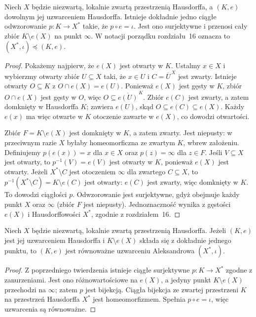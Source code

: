\begin{twierdzenie}
\label{thm:topog-uzwarcenia-aleksandrow-minimalne}
Niech $X$ będzie niezwartą,
lokalnie zwartą przestrzenią Hausdorffa,
a $(K,e)$ dowolnym jej uzwarceniem
Hausdorffa. Istnieje dokładnie jedno
ciągłe odwzorowanie
$p\colon K\to X^\ast$ takie, że
$p\circ e=\iota$.
Jest ono surjektywne
i przenosi cały zbiór
$K\setminus e(X)$ na punkt $\infty$.
W notacji porządku rozdziału~16
oznacza to $(X^\ast,\iota)\preccurlyeq(K,e)$.
\end{twierdzenie}
\begin{proof}
Pokażemy najpierw, że $e(X)$
jest otwarty w $K$.
Ustalmy $x\in X$ i wybierzmy
otwarty zbiór $U\subseteq X$
taki, że $x\in U$ i
$C=\overline U^{\,X}$ jest zwarty.
Istnieje otwarty $O\subseteq K$
z $O\cap e(X)=e(U)$.
Ponieważ $e(X)$ jest gęsty w $K$,
zbiór $O\cap e(X)$ jest gęsty w $O$,
więc
$O\subseteq\overline{e(U)}^{\,K}$.
Zbiór $e(C)$ jest zwarty, a zatem
domknięty w Hausdorffa $K$;
zawiera $e(U)$, skąd
$O\subseteq e(C)\subseteq e(X)$.
Każdy $e(x)$ ma więc
otwarte w $K$ otoczenie zawarte
w $e(X)$, co dowodzi otwartości.

Zbiór $F=K\setminus e(X)$ jest
domknięty w $K$, a zatem zwarty.
Jest niepusty: w przeciwnym razie
$X$ byłaby homeomorficzna ze zwartym
$K$, wbrew założeniu.
Definiujemy
$p(e(x))=x$ dla $x\in X$
oraz $p(z)=\infty$ dla $z\in F$.
Jeśli $V\subseteq X$ jest otwarty,
to $p^{-1}(V)=e(V)$ jest otwarty w $K$,
ponieważ $e(X)$ jest otwarty.
Jeżeli $X^\ast\setminus C$ jest
otoczeniem $\infty$ dla zwartego
$C\subseteq X$, to
$p^{-1}(X^\ast\setminus C)
=K\setminus e(C)$ jest otwarty:
$e(C)$ jest zwarty, więc domknięty w $K$.
To dowodzi ciągłości $p$.
Odwzorowanie jest surjektywne,
gdyż obejmuje każdy punkt $X$
oraz $\infty$ (zbiór $F$ jest niepusty).
Jednoznaczność wynika z gęstości
$e(X)$ i Hausdorffowości $X^\ast$,
zgodnie z rozdziałem~16.
\end{proof}

\begin{wniosek}
\label{cor:topog-uzwarcenia-aleksandrow-jednoznacznosc}
Niech $X$ będzie niezwartą, lokalnie zwartą
przestrzenią Hausdorffa. Jeżeli $(K,e)$
jest jej uzwarceniem Hausdorffa i
$K\setminus e(X)$ składa się z dokładnie
jednego punktu, to $(K,e)$ jest równoważne
uzwarceniu Aleksandrowa $(X^\ast,\iota)$.
\end{wniosek}
\begin{proof}
Z poprzedniego twierdzenia istnieje
ciągłe surjektywne
$p\colon K\to X^\ast$ zgodne
z zanurzeniami. Jest ono różnowartościowe
na $e(X)$, a jedyny punkt
$K\setminus e(X)$ przechodzi na $\infty$;
zatem $p$ jest bijekcją.
Ciągła bijekcja ze zwartej
przestrzeni $K$ na przestrzeń
Hausdorffa $X^\ast$ jest
homeomorfizmem. Spełnia
$p\circ e=\iota$,
więc uzwarcenia są równoważne.
\end{proof}

